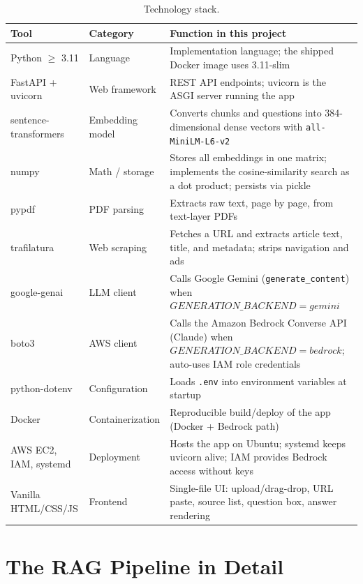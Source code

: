 \documentclass[11pt,a4paper]{article}
\newcommand{\code}[1]{\texttt{#1}}
\begin{document}
\begin{table}[h]
\centering
\small
\begin{tabular}{>{\raggedright}p{3.4cm} >{\raggedright}p{4.6cm} p{7.0cm}}
\toprule
\textbf{Tool} & \textbf{Category} & \textbf{Function in this project} \\
\midrule
Python $\geq$ 3.11 & Language & Implementation language; the shipped Docker image uses 3.11-slim \\
FastAPI + uvicorn & Web framework & REST API endpoints; uvicorn is the ASGI server running the app \\
sentence-transformers & Embedding model & Converts chunks and questions into 384-dimensional dense vectors with \texttt{all-MiniLM-L6-v2} \\
numpy & Math / storage & Stores all embeddings in one matrix; implements the cosine-similarity search as a dot product; persists via pickle \\
pypdf & PDF parsing & Extracts raw text, page by page, from text-layer PDFs \\
trafilatura & Web scraping & Fetches a URL and extracts article text, title, and metadata; strips navigation and ads \\
google-genai & LLM client & Calls Google Gemini (\texttt{generate\_content}) when $GENERATION\_BACKEND=gemini$ \\
boto3 & AWS client & Calls the Amazon Bedrock Converse API (Claude) when $GENERATION\_BACKEND=bedrock$; auto-uses IAM role credentials \\
python-dotenv & Configuration & Loads \code{.env} into environment variables at startup \\
Docker & Containerization & Reproducible build/deploy of the app (Docker + Bedrock path) \\
AWS EC2, IAM, systemd & Deployment & Hosts the app on Ubuntu; systemd keeps uvicorn alive; IAM provides Bedrock access without keys \\
Vanilla HTML/CSS/JS & Frontend & Single-file UI: upload/drag-drop, URL paste, source list, question box, answer rendering \\
\bottomrule
\end{tabular}
\caption{Technology stack.}
\label{tab:stack}
\end{table}

\section{The RAG Pipeline in Detail}
\end{document}
